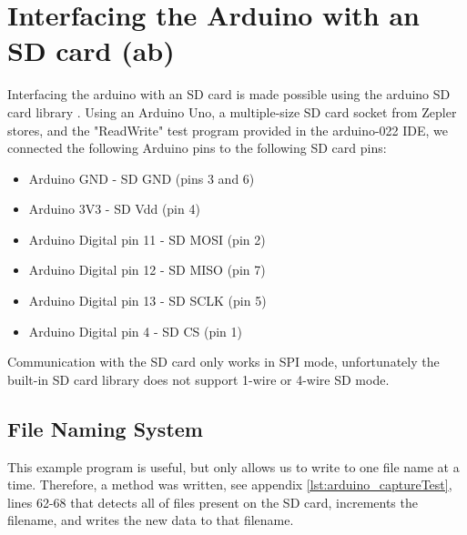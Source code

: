 
\section{Interfacing the Arduino with an SD card (ab)}
\label{sec:SD_imp}

Interfacing the arduino with an SD card is made possible using the arduino SD card library \cite{arduino_sd_library}. Using an Arduino Uno,
 a multiple-size SD card socket from Zepler stores, and the 
"ReadWrite" test program provided in the arduino-022 IDE, we connected the following Arduino pins to the following SD card pins:

\begin{itemize}
\item Arduino GND - SD GND (pins 3 and 6)
\item Arduino 3V3 - SD Vdd (pin 4)
\item Arduino Digital pin 11 - SD MOSI (pin 2)
\item Arduino Digital pin 12 - SD MISO (pin 7)
\item Arduino Digital pin 13 - SD SCLK (pin 5)
\item Arduino Digital pin 4 - SD CS (pin 1)
\end{itemize}

Communication with the SD card only works in SPI mode, unfortunately the built-in 
SD card library does not support 1-wire or 4-wire SD mode.

\subsection{File Naming System}

This example program is useful, but only allows us to write to one file name at 
a time. Therefore, a method was written, see appendix \ref{lst:arduino_captureTest}, lines 62-68 that detects all of files present on the SD card, increments the filename, and 
writes the new data to that filename.
